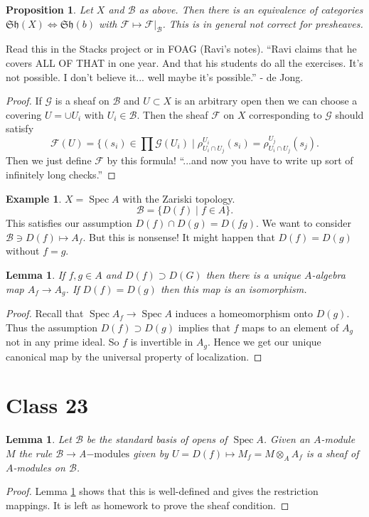 \documentclass{article}
\newcommand{\fr}{\mathfrak}
\DeclareMathOperator{\Spec}{Spec}
\theoremstyle{plain}
\newtheorem{lem}[thm]{Lemma}
\newtheorem{prop}[thm]{Proposition}
\theoremstyle{definition}
\newtheorem{exmp}{Example}
\theoremstyle{remark}
\begin{document}
\begin{prop}
Let $X$ and $\mathcal{B}$ as above. Then there is an equivalence of categories $\fr{Sh}(X)\Leftrightarrow \fr{Sh}(b)$ with $\mathcal{F}\mapsto\mathcal{F}|_\mathcal{B}$. This is in general not correct for presheaves.
\end{prop}
Read this in the Stacks project or in FOAG (Ravi's notes). ``Ravi claims that he covers ALL OF THAT in one year. And that his students do all the exercises. It's not possible. I don't believe it... well maybe it's possible.'' - de Jong.

\begin{proof}
If $\mathcal{G}$ is a sheaf on $\mathcal{B}$ and $U\subset X$ is an arbitrary open then we can choose a covering $U=\cup U_i$ with $U_i\in\mathcal{B}$. Then the sheaf $\mathcal{F}$ on $X$ corresponding to $\mathcal{G}$ should satisfy
\[\mathcal{F}(U)=\{(s_i)\in\prod \mathcal{G}(U_i)\mid \rho^{U_i}_{U_i\cap U_j}(s_i)=\rho^{U_j}_{U_i\cap U_j}(s_j).\]
Then we just define $\mathcal{F}$ by this formula! ``...and now you have to write up sort of infinitely long checks.''
\end{proof}

\begin{exmp}
$X=\Spec A$ with the Zariski topology.
\[\mathcal{B}=\{D(f) \mid f\in A\}.\]
This satisfies our assumption $D(f)\cap D(g)=D(fg)$. We want to consider $\mathcal{B}\ni D(f)\mapsto A_f$. But this is nonsense! It might happen that $D(f)=D(g)$ without $f=g$.
\end{exmp}

\begin{lem}
\label{SL1}
If $f,g\in A$ and $D(f)\supset D(G)$ then there is a unique $A$-algebra map $A_f\to A_g$. If $D(f)=D(g)$ then this map is an isomorphism.
\end{lem}
\begin{proof}
Recall that $\Spec A_f\to \Spec A$ induces a homeomorphism onto $D(g)$. Thus the assumption $D(f)\supset D(g)$ implies that $f$ maps to an element of $A_g$ not in any prime ideal. So $f$ is invertible in $A_g$. Hence we get our unique canonical map by the universal property of localization.
\end{proof}

\section*{Class 23}

\begin{lem}
\label{SL2}
Let $\mathcal{B}$ be the standard basis of opens of $\Spec A$. Given an $A$-module $M$ the rule $\mathcal{B}\to $A$-\text{modules}$ given by $U=D(f)\mapsto M_f=M\otimes_A A_f$ is a sheaf of $A$-modules on $\mathcal{B}$.
\end{lem}
\begin{proof}
Lemma \ref{SL1} shows that this is well-defined and gives the restriction mappings. It is left as homework to prove the sheaf condition.
\end{proof}
\end{document}
